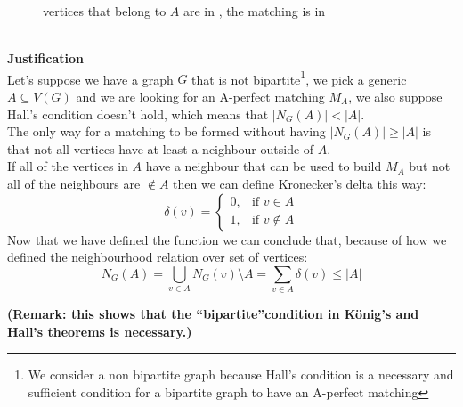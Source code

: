 \begin{enumerate}[a)]
\begin{figure}[h]
        \caption{vertices that belong to $A$ are in , the matching is in }
        \label{ex2}
    \end{figure}
    \\\linebreak
    \textbf{Justification}\\
    Let's suppose we have a graph $G$ that is not bipartite\footnote{We consider a non bipartite graph because Hall's condition is a necessary and sufficient condition for a bipartite graph to have an A-perfect matching}, we pick a generic $A \subseteq V(G)$ and we are looking for an A-perfect matching $M_A$, we also suppose Hall's condition doesn't hold, which means that $|N_G(A)| < |A|$.\\
    The only way for a matching to be formed without having $|N_G(A)| \geq |A|$ is that not all vertices have at least a neighbour outside of $A$.\\
    \linebreak
    If all of the vertices in $A$ have a neighbour that can be used to build $M_A$ but not all of the neighbours are $\notin A$ then we can define Kronecker's delta this way:
    \[
    \delta(v) =
    \begin{cases}
        0, & \text{if } v \in A \\
        1, & \text{if } v \notin A
    \end{cases}
    \]
    Now that we have defined the function we can conclude that, because of how we defined the neighbourhood relation over set of vertices:
    \begin{equation}
        N_G(A) = \bigcup_{v \in A} N_G(v) \setminus A = \sum_{v \in A} \delta(v) \leq |A|
    \end{equation}
    
    
\end{enumerate}
\textbf{(Remark: this shows that the “bipartite”condition in König’s and Hall’s theorems is necessary.)}
